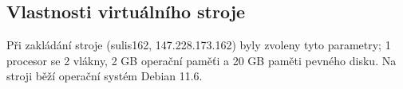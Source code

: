 \subsection{Vlastnosti virtuálního stroje}
Při zakládání stroje (sulis162, 147.228.173.162) byly zvoleny tyto parametry; 1 procesor se 2 vlákny, 2 GB operační paměťi a 20 GB paměti pevného disku. Na stroji běží operační systém Debian 11.6.